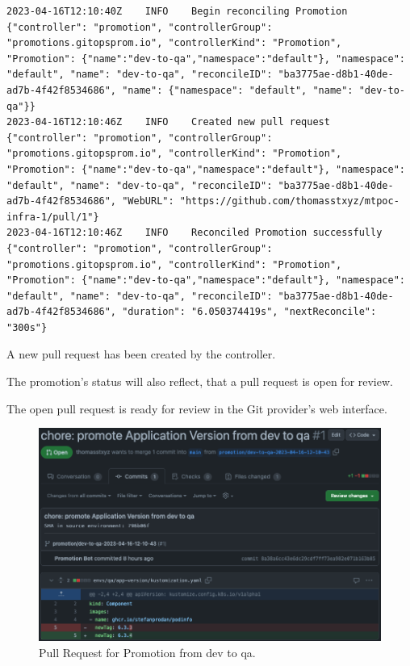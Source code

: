 \begin{lstlisting}
2023-04-16T12:10:40Z    INFO    Begin reconciling Promotion     {"controller": "promotion", "controllerGroup": "promotions.gitopsprom.io", "controllerKind": "Promotion", "Promotion": {"name":"dev-to-qa","namespace":"default"}, "namespace": "default", "name": "dev-to-qa", "reconcileID": "ba3775ae-d8b1-40de-ad7b-4f42f8534686", "name": {"namespace": "default", "name": "dev-to-qa"}}
2023-04-16T12:10:46Z    INFO    Created new pull request        {"controller": "promotion", "controllerGroup": "promotions.gitopsprom.io", "controllerKind": "Promotion", "Promotion": {"name":"dev-to-qa","namespace":"default"}, "namespace": "default", "name": "dev-to-qa", "reconcileID": "ba3775ae-d8b1-40de-ad7b-4f42f8534686", "WebURL": "https://github.com/thomasstxyz/mtpoc-infra-1/pull/1"}
2023-04-16T12:10:46Z    INFO    Reconciled Promotion successfully       {"controller": "promotion", "controllerGroup": "promotions.gitopsprom.io", "controllerKind": "Promotion", "Promotion": {"name":"dev-to-qa","namespace":"default"}, "namespace": "default", "name": "dev-to-qa", "reconcileID": "ba3775ae-d8b1-40de-ad7b-4f42f8534686", "duration": "6.050374419s", "nextReconcile": "300s"}
\end{lstlisting}

A new pull request
has been created by the controller.

The promotion's status will also reflect, that
a pull request is open for review.



The open pull request is ready for review in the Git provider's web interface.
\begin{figure}[h]
	\centering
	\includegraphics[width=1.00\linewidth]{assets/prom-pr-dev-to-qa.png}
	\caption{Pull Request for Promotion from dev to qa.
	}
	\label{fig:prom-pr-dev-to-qa}	
\end{figure}

